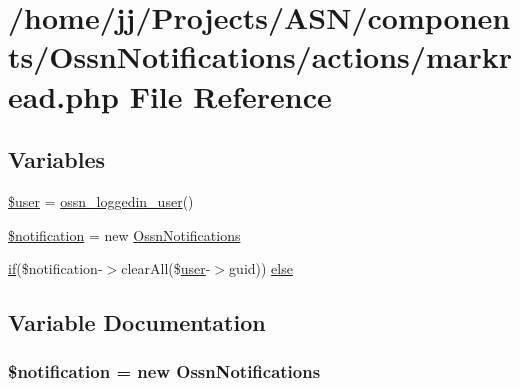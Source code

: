 \hypertarget{_ossn_notifications_2actions_2markread_8php}{}\section{/home/jj/\+Projects/\+A\+S\+N/components/\+Ossn\+Notifications/actions/markread.php File Reference}
\label{_ossn_notifications_2actions_2markread_8php}
\subsection*{Variables}
\begin{DoxyCompactItemize}
\item 
\hyperlink{_ossn_notifications_2actions_2markread_8php_a598ca4e71b15a1313ec95f0df1027ca5}{\$user} = \hyperlink{ossn_8lib_8users_8php_aa3c8068d0e6638b414d6a2f6c62565b8}{ossn\+\_\+loggedin\+\_\+user}()
\item 
\hyperlink{_ossn_notifications_2actions_2markread_8php_a31b24031fc7fcaa7848766b56934949b}{\$notification} = new \hyperlink{class_ossn_notifications}{Ossn\+Notifications}
\item 
\hyperlink{jquery_8tokeninput_8js_ad8dd46a3cbc004569e34401e9e71771a}{if}(\$notification-\/$>$clear\+All(\$\hyperlink{ossn_8config_8db_8example_8php_a802544b7ba9f79bbf24ef67773d53bed}{user}-\/$>$guid)) \hyperlink{_ossn_notifications_2actions_2markread_8php_a5eb027f9c791fd26d341031417e0d3e6}{else}
\end{DoxyCompactItemize}


\subsection{Variable Documentation}
\subsubsection[{\texorpdfstring{\$notification}{$notification}}]{\setlength{\rightskip}{0pt plus 5cm}\$notification = new {\bf Ossn\+Notifications}}\hypertarget{_ossn_notifications_2actions_2markread_8php_a31b24031fc7fcaa7848766b56934949b}{}\label{_ossn_notifications_2actions_2markread_8php_a31b24031fc7fcaa7848766b56934949b}



